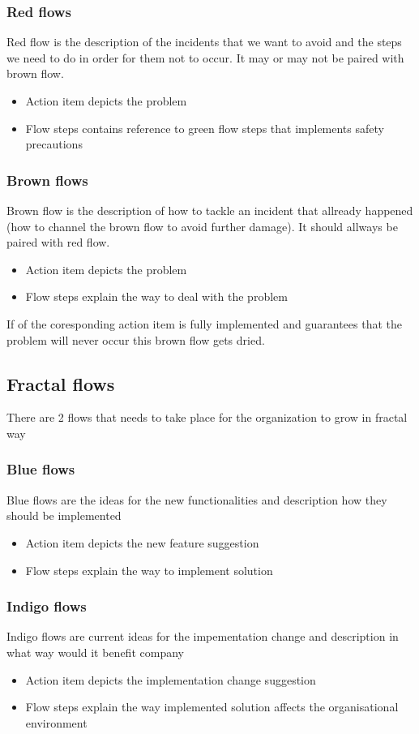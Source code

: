 \subsubsection{Red flows}\label{philo:red:flow}
Red flow is the description of the incidents that we want to avoid and the steps we need to do in order for them not to occur. It may or may not be paired with brown flow.
\begin{itemize}
  \item Action item depicts the problem 
  \item Flow steps contains reference to green flow steps that implements safety precautions
\end{itemize}
\subsubsection{Brown flows}\label{philo:brown:flow}
Brown flow is the description of how to tackle an incident that allready happened (how to channel the brown flow to avoid further damage). It should allways be paired with red flow.
\begin{itemize}
  \item Action item depicts the problem 
  \item Flow steps explain the way to deal with the problem
\end{itemize}
If  of the coresponding action item is fully implemented and guarantees that the problem will never occur this brown flow gets dried.
\subsection{Fractal flows}
There are 2 flows that needs to take place for the organization to grow in fractal way
\subsubsection{Blue flows}\label{philo:blue:flow}
Blue flows are the ideas for the new functionalities and description how they should be implemented
\begin{itemize}
  \item Action item depicts the new feature suggestion 
  \item Flow steps explain the way to implement solution
\end{itemize}
\subsubsection{Indigo flows}\label{philo:indigo:flow}
Indigo flows are current ideas for the impementation change and description in what way would it benefit company
\begin{itemize}
  \item Action item depicts the implementation change suggestion 
  \item Flow steps explain the way implemented solution affects the organisational environment
\end{itemize}
